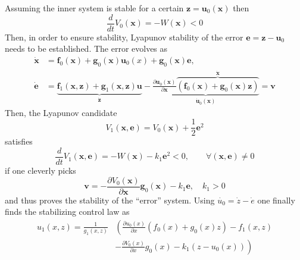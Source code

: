 \newpar{}
Assuming the inner system is stable for a certain $\mathbf{z} = \mathbf{u}_0(\mathbf{x})$ then
\noindent\begin{equation*}
    \frac{d}{dt} V_0(\mathbf{x}) = -W(\mathbf{x}) < 0
\end{equation*}
Then, in order to ensure stability, Lyapunov stability of the error $\mathbf{e} = \mathbf{z}-\mathbf{u}_0$ needs to be established.
The error evolves as
\begin{align*}
    \dot{\mathbf{x}} & =\mathbf{f}_{0}(\mathbf{x})+\mathbf{g}_{0}(\mathbf{x})\mathbf{u}_{0}(x)+\mathbf{g}_{0}(\mathbf{x})\mathbf{e},                                                                                                                                                                                                                                              \\
    \dot{\mathbf{e}} & =\underbrace{\mathbf{f}_{1}(\mathbf{x},\mathbf{z})+\mathbf{g}_{1}(\mathbf{x},\mathbf{z})\mathbf{u}}_{\dot{\mathbf{z}}}-\underbrace{\frac{\partial \mathbf{u}_{0}(\mathbf{x})}{\partial \mathbf{x}}\overbrace{\left(\mathbf{f}_{0}(\mathbf{x})+\mathbf{g}_{0}(\mathbf{x})\mathbf{z}\right)}^{\dot{\mathbf{x}}}}_{\dot{\mathbf{u}}_0(\mathbf{x})}=\mathbf{v}
\end{align*}
Then, the Lyapunov candidate
\noindent\begin{equation*}
    V_1(\mathbf{x}, \mathbf{e}) = V_0(\mathbf{x})+\frac{1}{2} \mathbf{e}^2
\end{equation*}
satisfies
\noindent\begin{equation*}
    \frac{d}{dt}V_1(\mathbf{x}, \mathbf{e}) = -W(\mathbf{x}) - k_1 \mathbf{e}^2 <0 ,\qquad \forall(\mathbf{x},\mathbf{e}) \neq 0
\end{equation*}
if one cleverly picks
\begin{equation*}
    \mathbf{v}=-\frac{\partial V_0(\mathbf{x})}{\partial \mathbf{x}}\mathbf{g}_0(\mathbf{x})-k_1\mathbf{e},\quad k_1>0
\end{equation*}
and thus proves the stability of the ``error'' system.
Using $\dot{u_0}=\dot{z}-\dot{e}$ one finally finds the stabilizing control law as
\begin{align*}
    u_1(x,z)  = \frac{1}{g_1(x,z)} & \left(\frac{\partial u_0(x)}{\partial x}\left(f_0(x)+g_0(x)z\right)-f_1(x,z) \right. \\
                                   & \left. -\frac{\partial V_0(x)}{\partial x}g_0(x)-k_1(z-u_0(x))\right)
\end{align*}

